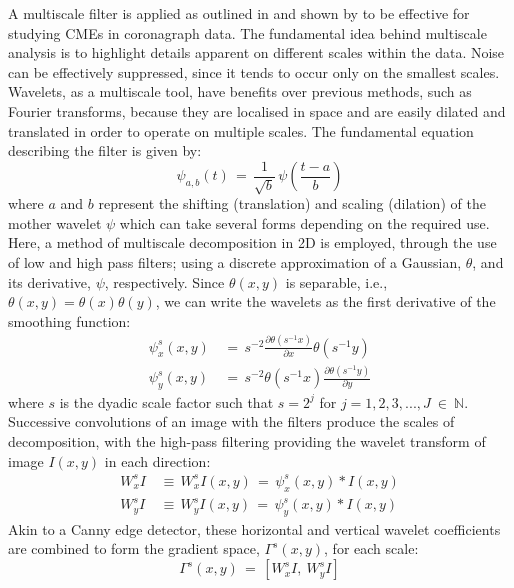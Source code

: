 \documentclass[preprint2]{aastex}
\begin{document}
A multiscale filter is applied as outlined in \citet{2008SoPh..248..457Y} and shown by \citet{2009A&A...495..325B, 2010NatCo...1E..74B, 2011AdSpR..47.2118G, 2011igi-global} to be effective for studying CMEs in coronagraph data. The fundamental idea behind multiscale analysis is to highlight details apparent on different scales within the data. Noise can be effectively suppressed, since it tends to occur only on the smallest scales. Wavelets, as a multiscale tool, have benefits over previous methods, such as Fourier transforms, because they are localised in space and are easily dilated and translated in order to operate on multiple scales. The fundamental equation describing the filter is given by:
\begin{equation}
\psi_{a,b}(t)\,=\, \frac{1}{\sqrt{b}} \, \psi (\frac{t-a}{b})
\end{equation}
where $a$ and $b$ represent the shifting (translation) and scaling (dilation) of the mother wavelet $\psi$ which can take several forms depending on the required use. Here, a method of multiscale decomposition in 2D is employed, through the use of low and high pass filters; using a discrete approximation of a Gaussian, $\theta$, and its derivative, $\psi$, respectively. Since $\theta(x,y)$ is separable, i.e., $\theta(x,y)=\theta(x)\theta(y)$, we can write the wavelets as the first derivative of the smoothing function:
\begin{eqnarray}
\psi_{x}^{s}(x,y)\,&=\, s^{-2} \frac{\partial \theta(s^{-1}x)}{\partial x}\theta(s^{-1}y) \\
\psi_{y}^{s}(x,y)\,&=\, s^{-2} \theta(s^{-1}x)\frac{\partial \theta(s^{-1}y)}{\partial y}
\end{eqnarray}
where $s$ is the dyadic scale factor such that $s=2^j$ for $j=1,2,3,...,J~\in~\mathbb{N}$. Successive convolutions of an image with the filters produce the scales of decomposition, with the high-pass filtering providing the wavelet transform of image $I(x,y)$ in each direction:
\begin{eqnarray}
W_{x}^{s}I \,&\equiv\, W_{x}^s I(x,y)\,=\,\psi_{x}^s (x,y)*I(x,y) \\
W_{y}^{s}I \,&\equiv\, W_{y}^s I(x,y)\,=\,\psi_{y}^s (x,y)*I(x,y)
\end{eqnarray}
Akin to a Canny edge detector, these horizontal and vertical wavelet coefficients are combined to form the gradient space, $\Gamma^s(x,y)$, for each scale: 
\begin{equation}
\Gamma^s (x,y)\, = \,\left[W_{x}^s I,~W_{y}^s I \right]
\end{equation}
\end{document}
